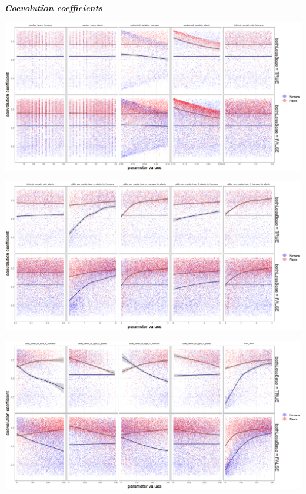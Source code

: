 \documentclass[
]{book}
\begin{document}

\textbf{\emph{Coevolution coefficients}}

\includegraphics[width=1\linewidth]{plots/5_LHS_bothLessBase_coevolution_coefficients_bifurcationPlot_twoVariables_per_parameter_and_scenario_part1}

\includegraphics[width=1\linewidth]{plots/5_LHS_bothLessBase_coevolution_coefficients_bifurcationPlot_twoVariables_per_parameter_and_scenario_part2}

\includegraphics[width=1\linewidth]{plots/5_LHS_bothLessBase_coevolution_coefficients_bifurcationPlot_twoVariables_per_parameter_and_scenario_part3}
\end{document}
